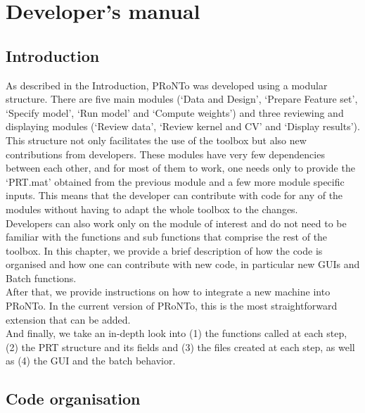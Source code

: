 
\chapter{Developer's manual}
\minitoc

\section{Introduction}

As described in the Introduction, PRoNTo was developed using a modular structure. There are five main modules (`Data and Design', `Prepare Feature set', `Specify model', `Run model' and `Compute weights') and three reviewing and displaying modules (`Review data', `Review kernel and CV' and `Display results'). This structure not only facilitates the use of the toolbox but also new contributions from developers. These modules have very few dependencies between each other, and for most of them to work, one needs only to provide the `PRT.mat' obtained from the previous module and a few more module specific inputs. This means that the developer can contribute with code for any of the modules without having to adapt the whole toolbox to the changes.
\\

Developers can also work only on the module of interest and do not need to be familiar with the functions and sub functions that comprise the rest of the toolbox. In this chapter, we provide a brief description of how the code is organised and how one can contribute with new code, in particular new GUIs and Batch functions.
\\

After that, we provide instructions on how to integrate a new machine into PRoNTo. In the current version of PRoNTo, this is the most straightforward extension that can be added.
\\

And finally, we take an in-depth look into (1) the functions called at each step, (2) the PRT structure and its fields and (3) the files created at each step, as well as (4) the GUI and the batch behavior.


\section{Code organisation}


